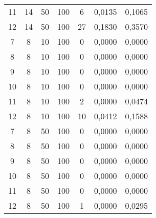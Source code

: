 \begin{table}[H]
\begin{tabular}{@{}ccccccc@{}}
11 & 14                                                    & 50                                                        & 100 & 6  & 0,0135        & 0,1065       \\
12 & 14                                                    & 50                                                        & 100 & 27 & 0,1830        & 0,3570       \\
7  & 8                                                     & 10                                                        & 100 & 0  & 0,0000        & 0,0000       \\
8  & 8                                                     & 10                                                        & 100 & 0  & 0,0000        & 0,0000       \\
9  & 8                                                     & 10                                                        & 100 & 0  & 0,0000        & 0,0000       \\
10 & 8                                                     & 10                                                        & 100 & 0  & 0,0000        & 0,0000       \\
11 & 8                                                     & 10                                                        & 100 & 2  & 0,0000        & 0,0474       \\
12 & 8                                                     & 10                                                        & 100 & 10 & 0,0412        & 0,1588       \\
7  & 8                                                     & 50                                                        & 100 & 0  & 0,0000        & 0,0000       \\
8  & 8                                                     & 50                                                        & 100 & 0  & 0,0000        & 0,0000       \\
9  & 8                                                     & 50                                                        & 100 & 0  & 0,0000        & 0,0000       \\
10 & 8                                                     & 50                                                        & 100 & 0  & 0,0000        & 0,0000       \\
11 & 8                                                     & 50                                                        & 100 & 0  & 0,0000        & 0,0000       \\
12 & 8                                                     & 50                                                        & 100 & 1  & 0,0000        & 0,0295       \\ \bottomrule
\end{tabular}
\end{table}




